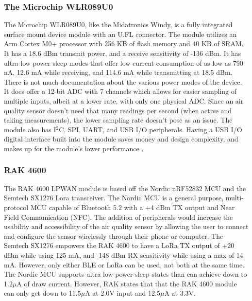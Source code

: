 \subsubsection{The Microchip WLR089U0}
The Microchip WLR089U0, like the Midatronics Windy, is a fully integrated
surface mount device module with an U.FL connector. The module utilizes an Arm
Cortex M0+ processor with 256 KB of flash memory and 40 KB of SRAM. It has a
18.6 dBm transmit power, and a receive sensitivity of -136 dBm. It has ultra-low
power sleep modes that offer low current consumption of as low as 790 nA, 12.6 mA
while receiving, and 114.6 mA while transmitting at 18.5 dBm. There is not much
documentation about the various power modes of the device. It does offer a
12-bit ADC with 7 channels which allows for easier sampling of multiple inputs,
albeit at a lower rate, with only one physical ADC. Since an air quality sensor
doesn't need that many readings per second (when active and taking
measurements), the lower sampling rate doesn't pose as an issue. The module also
has I$^2$C, SPI, UART, and USB I/O peripherals. Having a USB I/O digital
interface built into the module saves money and design complexity, and makes up
for the module's lower performance \cite{ds-wlr089u0}\cite{ds-atsamr34j18}.

\subsubsection{RAK 4600}
The RAK 4600 LPWAN module is based off the Nordic nRF52832 MCU and the
Semtech SX1276 Lora transceiver. The Nordic MCU is a general purpose,
multi-protocol MCU capable of Bluetooth 5.2 with a +4 dBm TX output and Near
Field Communication (NFC). The addition of peripherals would increase the
usability and accessibility of the air quality sensor by allowing the user to
connect and configure the sensor wirelessly through their phone or computer. The
Semtech SX1276 empowers the RAK 4600 to have a LoRa TX output of +20 dBm while
using 125 mA, and -148 dBm RX sensitivity while using a max of 14 mA. However,
only either BLE or LoRa can be used, not both at the same time. The Nordic MCU
supports ultra low-power sleep states than can achieve down to 1.2$\mu$A of draw
current. However, RAK states that that the RAK 4600 module can only get down to
11.5$\mu$A at 2.0V input and 12.5$\mu$A at 3.3V.

